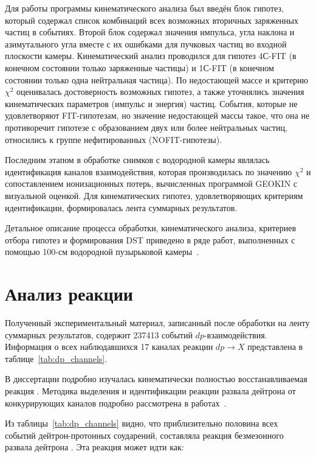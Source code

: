 Для работы программы кинематического анализа был введён блок гипотез, который
содержал список комбинаций всех возможных вторичных заряженных частиц в
событиях. Второй блок содержал значения импульса, угла наклона и азимутального
угла вместе с их ошибками для пучковых частиц во входной плоскости камеры.
Кинематический анализ проводился для гипотез 4С-FIT (в конечном состоянии только
заряженные частицы) и 1С-FIT (в конечном состоянии только одна нейтральная
частица). По недостающей массе и критерию $\chi^2$ оценивалась достоверность
возможных гипотез, а также уточнялись значения кинематических параметров
(импульс и энергия) частиц. События, которые не удовлетворяют FIT-гипотезам, но
значение недостающей массы такое, что она не противоречит гипотезе с
образованием двух или более нейтральных частиц, относились к группе
нефитированных (NOFIT-гипотезы).

Последним этапом в обработке снимков с водородной камеры являлась идентификация
каналов взаимодействия, которая производилась по значению $\chi^{2}$ и
сопоставлением ионизационных потерь, вычисленных программой GEOKIN с визуальной
оценкой. Для кинематических гипотез, удовлетворяющих критериям идентификации,
формировалась лента суммарных результатов.

Детальное описание процесса обработки, кинематического анализа, критериев отбора
гипотез и формирования DST приведено в ряде работ, выполненных с помощью 100-см
водородной пузырьковой камеры~\cite{glagolev76,kachara88,niora91}.

\section{Анализ реакции \maybebm{{\dpfrag}}}
Полученный экспериментальный материал, записанный после обработки на ленту
суммарных результатов, содержит 237413 событий $dp$-взаимодействия. Информация о
всех наблюдавшихся 17 каналах реакции $dp \rightarrow X$ представлена в
таблице~\ref{tab:dp_channels}.


В диссертации подробно изучалась кинематически полностью восстанавливаемая
реакция \dpfrag. Методика выделения и идентификации реакции развала дейтрона
\dpfrag от конкурирующих каналов подробно рассмотрена в
работах~\cite{alad75,alad73}.

Из таблицы~\ref{tab:dp_channels} видно, что приблизительно половина всех событий
дейтрон-протонных соударений, составляла реакция безмезонного развала дейтрона
\dpfrag. Эта реакция может идти как:


